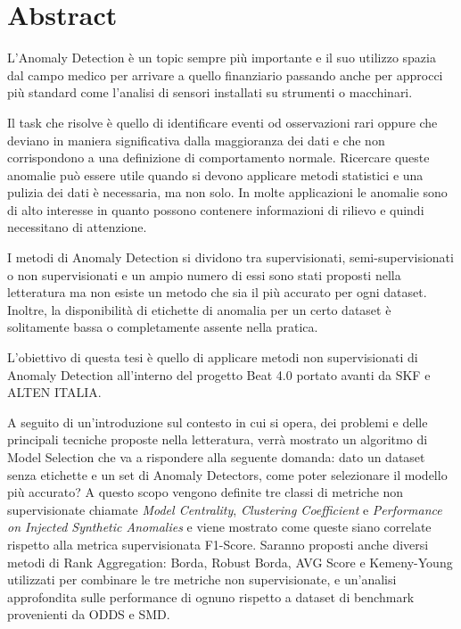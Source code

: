 \chapter*{Abstract}
L’Anomaly Detection è un topic sempre più importante e il suo utilizzo spazia dal campo medico per arrivare a quello finanziario passando anche per approcci più standard come l'analisi di sensori installati su strumenti o macchinari.

Il task che risolve è quello di identificare eventi od osservazioni rari oppure che deviano in maniera significativa dalla maggioranza dei dati e che non corrispondono a una definizione di comportamento normale. Ricercare queste anomalie può essere utile quando si devono applicare metodi statistici e una pulizia dei dati è necessaria, ma non solo. In molte applicazioni le anomalie sono di alto interesse in quanto possono contenere informazioni di rilievo e quindi necessitano di attenzione. 

I metodi di Anomaly Detection si dividono tra supervisionati, semi-supervisionati o non supervisionati e un ampio numero di essi sono stati proposti nella letteratura ma non esiste un metodo che sia il più accurato per ogni dataset. Inoltre, la disponibilità di etichette di anomalia per un certo dataset è solitamente bassa o completamente assente nella pratica. 


L’obiettivo di questa tesi è quello di applicare metodi non supervisionati di Anomaly Detection all'interno del progetto Beat 4.0 portato avanti da SKF e ALTEN ITALIA. 

A seguito di un'introduzione sul contesto in cui si opera, dei problemi e delle principali tecniche proposte nella letteratura, verrà mostrato un algoritmo di Model Selection che va a rispondere alla seguente domanda: dato un dataset senza etichette e un set di Anomaly Detectors, come poter selezionare il modello più accurato? A questo scopo vengono definite tre classi di metriche non supervisionate chiamate \textit{Model Centrality}, \textit{Clustering Coefficient} e \textit{Performance on Injected Synthetic Anomalies} e viene mostrato come queste siano correlate rispetto alla metrica supervisionata F1-Score. Saranno proposti anche diversi metodi di Rank Aggregation: Borda, Robust Borda, AVG Score e Kemeny-Young utilizzati per combinare le tre metriche non supervisionate, e un'analisi approfondita sulle performance di ognuno rispetto a dataset di benchmark provenienti da ODDS e SMD.

